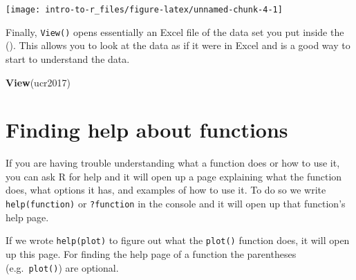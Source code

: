 \documentclass[
  12pt,
]{book}
\newenvironment{Shaded}{\begin{snugshade}}{\end{snugshade}}
\newcommand{\DataTypeTok}[1]{\textcolor[rgb]{0.13,0.29,0.53}{#1}}
\newcommand{\KeywordTok}[1]{\textcolor[rgb]{0.13,0.29,0.53}{\textbf{#1}}}
\newcommand{\NormalTok}[1]{#1}
\newcommand{\OperatorTok}[1]{\textcolor[rgb]{0.81,0.36,0.00}{\textbf{#1}}}
\begin{document}
\begin{Shaded}
\end{Shaded}

\begin{center}\texttt{[image: intro-to-r\_files/figure-latex/unnamed-chunk-4-1]} \end{center}

Finally, \texttt{View()} opens essentially an Excel file of the data set you put inside the (). This allows you to look at the data as if it were in Excel and is a good way to start to understand the data.

\begin{Shaded}
\begin{Highlighting}[]
\KeywordTok{View}\NormalTok{(ucr2017)}
\end{Highlighting}
\end{Shaded}

\hypertarget{finding-help-about-functions}{%
\section{Finding help about functions}\label{finding-help-about-functions}}

If you are having trouble understanding what a function does or how to use it, you can ask R for help and it will open up a page explaining what the function does, what options it has, and examples of how to use it. To do so we write \texttt{help(function)} or \texttt{?function} in the console and it will open up that function's help page.

If we wrote \texttt{help(plot)} to figure out what the \texttt{plot()} function does, it will open up this page. For finding the help page of a function the parentheses (e.g.~\texttt{plot()}) are optional.
\end{document}
